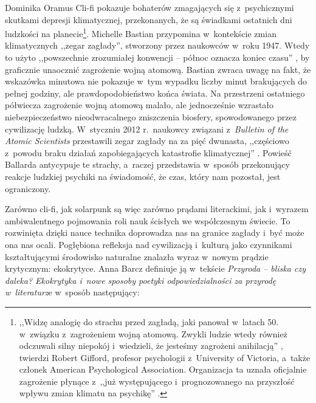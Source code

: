 \begin{artplenv}{Dominika Oramus}
Cli-fi pokazuje bohaterów zmagających się z~psychicznymi skutkami depresji klimatycznej, przekonanych, że są świadkami ostatnich dni ludzkości na planecie\footnote{,,Widzę analogię do strachu przed zagładą, jaki panował w~latach 50. w~związku z~zagrożeniem wojną atomową. Zwykli ludzie wtedy również odczuwali silny niepokój i~wiedzieli, że jesteśmy zagrożeni anihilacją''
\parencite[][]{hamilton_climate_2016}, %
 twierdzi Robert Gifford, profesor psychologii z~University of Victoria, a~także członek American Psychological Association. Organizacja ta uznała oficjalnie zagrożenie płynące z~,,już występującego i~prognozowanego na przyszłość wpływu zmian klimatu na psychikę''
\parencite[][]{hamilton_climate_2016}.
 }. Michelle Bastian przypomina w~kontekście zmian klimatycznych ,,zegar zagłady'', stworzony przez naukowców w~roku 1947. Wtedy to użyto ,,powszechnie zrozumiałej konwencji -- północ oznacza koniec czasu'' 
\parencite[][s.~39]{bastian_fatally_2012}, %
 by graficznie unaocznić zagrożenie wojną atomową. Bastian zwraca uwagę na fakt, że wskazówka minutowa nie pokazuje w~tym wypadku liczby minut brakujących do pełnej godziny, ale prawdopodobieństwo końca świata. Na przestrzeni ostatniego półwiecza zagrożenie wojną atomową malało, ale jednocześnie wzrastało niebezpieczeństwo nieodwracalnego zniszczenia biosfery, spowodowanego przez cywilizację ludzką. W~styczniu 2012 r.~naukowcy związani z~\textit{Bulletin of the Atomic Scientists} przestawili zegar zagłady na za pięć dwunasta, ,,częściowo z~powodu braku działań zapobiegających katastrofie klimatycznej'' 
\parencite[][s.~39]{bastian_fatally_2012}. %
 Powieść Ballarda antycypuje te strachy, a~raczej przedstawia w~sposób przekonujący reakcje ludzkiej psychiki na świadomość, że czas, który nam pozostał, jest ograniczony.

Zarówno cli-fi, jak solarpunk są więc zarówno prądami literackimi, jak i~wyrazem ambiwalentnego pojmowania roli nauk ścisłych we współczesnym świecie. To rozwinięta dzięki nauce technika doprowadza nas na granice zagłady i~być może ona nas ocali. Pogłębiona refleksja nad cywilizacją i~kulturą jako czynnikami kształtującymi środowisko naturalne znalazła wyraz w~nowym prądzie krytycznym: ekokrytyce. Anna Barcz definiuje ją w~tekście \textit{Przyroda -- bliska czy daleka? Ekokrytyka i~nowe sposoby poetyki odpowiedzialności za przyrodę w~literaturz}e w~sposób następujący:


\end{artplenv}
